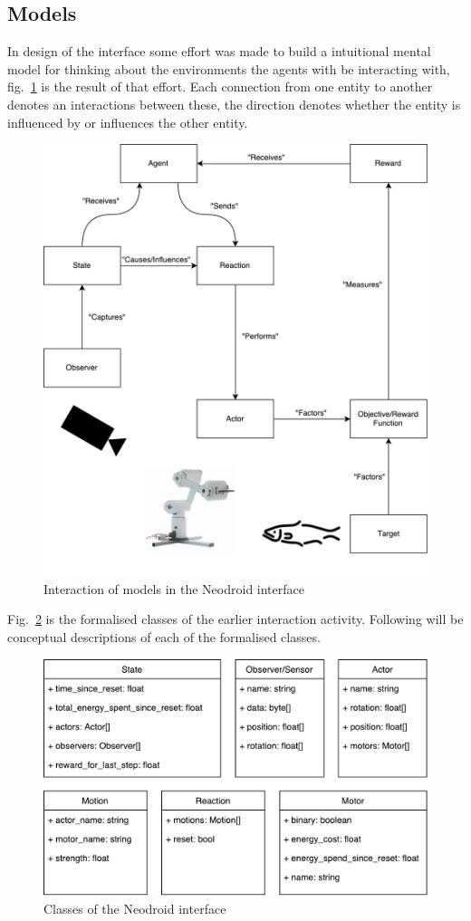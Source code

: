 \subsection{Models}

In design of the interface some effort was made to build a intuitional mental model for thinking about the environments the agents with be interacting with, fig.~\ref{fig:interaction} is the result  of that effort. Each connection from one entity to another denotes an interactions between these, the direction denotes whether the entity is influenced by or influences the other entity.

\begin{figure}
\centering
\includegraphics[width=.9\linewidth]{figures/neodroid_classes_verbs.pdf}
\caption{Interaction of models in the Neodroid interface}
\label{fig:interaction}
\end{figure}

Fig.~\ref{fig:classes} is the formalised classes of the earlier interaction activity. Following will be conceptual descriptions of each of the formalised classes.

\begin{figure}
\centering
\includegraphics[width=.8\linewidth]{figures/neodroid_classes.pdf}
\caption{Classes of the Neodroid interface}
\label{fig:classes}
\end{figure}

